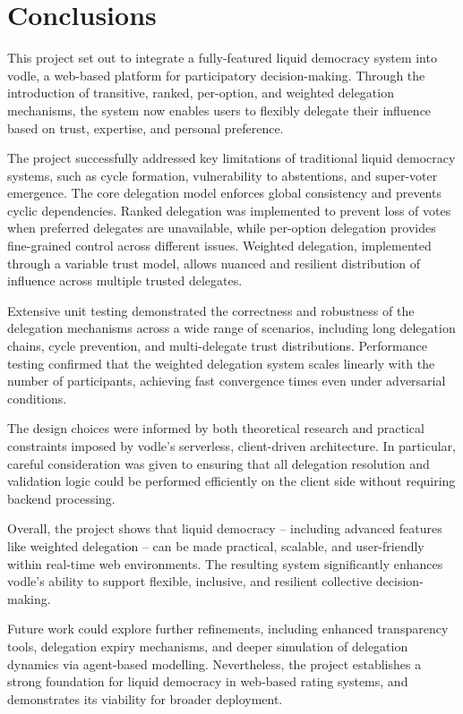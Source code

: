 \chapter{Conclusions}\label{ch:conclusions}
This project set out to integrate a fully-featured liquid democracy system into vodle, a web-based platform for participatory decision-making. Through the introduction of transitive, ranked, per-option, and weighted delegation mechanisms, the system now enables users to flexibly delegate their influence based on trust, expertise, and personal preference.

The project successfully addressed key limitations of traditional liquid democracy systems, such as cycle formation, vulnerability to abstentions, and super-voter emergence. The core delegation model enforces global consistency and prevents cyclic dependencies. Ranked delegation was implemented to prevent loss of votes when preferred delegates are unavailable, while per-option delegation provides fine-grained control across different issues. Weighted delegation, implemented through a variable trust model, allows nuanced and resilient distribution of influence across multiple trusted delegates.

Extensive unit testing demonstrated the correctness and robustness of the delegation mechanisms across a wide range of scenarios, including long delegation chains, cycle prevention, and multi-delegate trust distributions. Performance testing confirmed that the weighted delegation system scales linearly with the number of participants, achieving fast convergence times even under adversarial conditions.

The design choices were informed by both theoretical research and practical constraints imposed by vodle's serverless, client-driven architecture. In particular, careful consideration was given to ensuring that all delegation resolution and validation logic could be performed efficiently on the client side without requiring backend processing.

Overall, the project shows that liquid democracy -- including advanced features like weighted delegation -- can be made practical, scalable, and user-friendly within real-time web environments. The resulting system significantly enhances vodle's ability to support flexible, inclusive, and resilient collective decision-making.

Future work could explore further refinements, including enhanced transparency tools, delegation expiry mechanisms, and deeper simulation of delegation dynamics via agent-based modelling. Nevertheless, the project establishes a strong foundation for liquid democracy in web-based rating systems, and demonstrates its viability for broader deployment.


